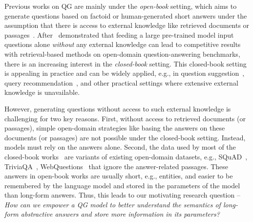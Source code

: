\documentclass[11pt]{article}
\begin{document}
\noindent Previous works on QG are mainly under the \textit{open-book} setting, which aims to generate questions based on factoid or human-generated short answers under the assumption that there is access to external knowledge like retrieved documents or passages~\cite{du-etal-2017-learning, zhao-etal-2018-paragraph, kim2019improving, fei-etal-2021-iterative}. After~\citet{roberts-etal-2020-much} demonstrated that feeding a large pre-trained model input questions alone \textit{without} any external knowledge can lead to competitive results with retrieval-based methods on open-domain question-answering benchmarks, there is an increasing interest in the \textit{closed-book} setting. This closed-book setting is appealing in practice and can be widely applied, e.g., in question suggestion~\cite{laban-etal-2020-whats, yin2021summary},  query recommendation~\cite{kim-etal-2021-query}, and other practical settings where extensive external knowledge is unavailable. 

However, generating questions without access to such external knowledge is challenging for two key reasons. First, without access to retrieved documents (or passages), simple open-domain strategies like basing the answers on these documents (or passages) are not possible under the closed-book setting. Instead, models must rely on the answers alone. Second, the data used by most of the closed-book works~\cite{lewis-etal-2021-paq, wang-etal-2021-generative} are variants of existing open-domain datasets, e.g., SQuAD~\cite{rajpurkar-etal-2018-know}, TriviaQA~\cite{joshi-etal-2017-triviaqa}, WebQuestions~\cite{berant-etal-2013-semantic} that ignore the answer-related passages. These answers in open-book works are usually short, e.g., entities, and easier to be remembered by the language model and stored in the parameters of the model than long-form answers. Thus, this leads to our motivating research question -- \textit{How can we empower a QG model to better understand the semantics of long-form abstractive answers and store more information in its parameters?}
\end{document}

